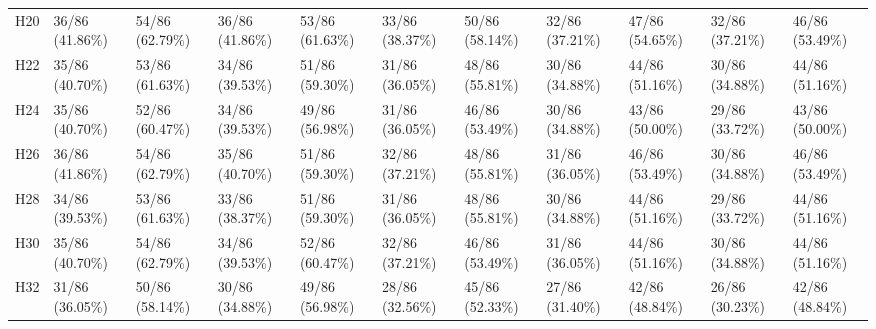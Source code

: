 \begin{table}[tbp]
\begin{tabular}{lllllllllll}
H20 & 36/86 (41.86\%) & 54/86 (62.79\%) & 36/86 (41.86\%) & 53/86 (61.63\%) & 33/86 (38.37\%) & 50/86 (58.14\%) & 32/86 (37.21\%) & 47/86 (54.65\%) & 32/86 (37.21\%) & 46/86 (53.49\%) \\
H22 & 35/86 (40.70\%) & 53/86 (61.63\%) & 34/86 (39.53\%) & 51/86 (59.30\%) & 31/86 (36.05\%) & 48/86 (55.81\%) & 30/86 (34.88\%) & 44/86 (51.16\%) & 30/86 (34.88\%) & 44/86 (51.16\%) \\
H24 & 35/86 (40.70\%) & 52/86 (60.47\%) & 34/86 (39.53\%) & 49/86 (56.98\%) & 31/86 (36.05\%) & 46/86 (53.49\%) & 30/86 (34.88\%) & 43/86 (50.00\%) & 29/86 (33.72\%) & 43/86 (50.00\%) \\
H26 & 36/86 (41.86\%) & 54/86 (62.79\%) & 35/86 (40.70\%) & 51/86 (59.30\%) & 32/86 (37.21\%) & 48/86 (55.81\%) & 31/86 (36.05\%) & 46/86 (53.49\%) & 30/86 (34.88\%) & 46/86 (53.49\%) \\
H28 & 34/86 (39.53\%) & 53/86 (61.63\%) & 33/86 (38.37\%) & 51/86 (59.30\%) & 31/86 (36.05\%) & 48/86 (55.81\%) & 30/86 (34.88\%) & 44/86 (51.16\%) & 29/86 (33.72\%) & 44/86 (51.16\%) \\
H30 & 35/86 (40.70\%) & 54/86 (62.79\%) & 34/86 (39.53\%) & 52/86 (60.47\%) & 32/86 (37.21\%) & 46/86 (53.49\%) & 31/86 (36.05\%) & 44/86 (51.16\%) & 30/86 (34.88\%) & 44/86 (51.16\%) \\
H32 & 31/86 (36.05\%) & 50/86 (58.14\%) & 30/86 (34.88\%) & 49/86 (56.98\%) & 28/86 (32.56\%) & 45/86 (52.33\%) & 27/86 (31.40\%) & 42/86 (48.84\%) & 26/86 (30.23\%) & 42/86 (48.84\%) \\
\bottomrule
\end{tabular}
\end{table}
